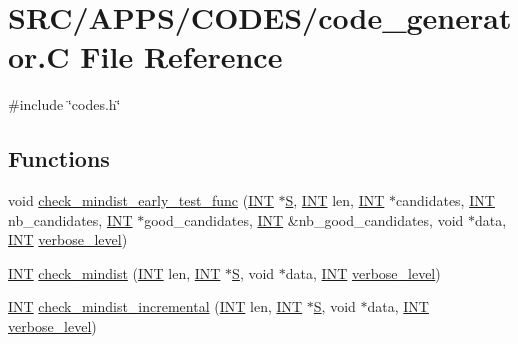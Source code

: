 \hypertarget{code__generator_8_c}{}\section{S\+R\+C/\+A\+P\+P\+S/\+C\+O\+D\+E\+S/code\+\_\+generator.C File Reference}
\label{code__generator_8_c}
{\ttfamily \#include \char`\"{}codes.\+h\char`\"{}}\newline
\subsection*{Functions}
\begin{DoxyCompactItemize}
\item 
void \mbox{\hyperlink{code__generator_8_c_a17bf777333c5e6dcb107d8de7ceffe5d}{check\+\_\+mindist\+\_\+early\+\_\+test\+\_\+func}} (\mbox{\hyperlink{galois_8h_a09fddde158a3a20bd2dcadb609de11dc}{I\+NT}} $\ast$\mbox{\hyperlink{simeon_8_c_adab47f8243f1b5a2c31df2535d6b37d0}{S}}, \mbox{\hyperlink{galois_8h_a09fddde158a3a20bd2dcadb609de11dc}{I\+NT}} len, \mbox{\hyperlink{galois_8h_a09fddde158a3a20bd2dcadb609de11dc}{I\+NT}} $\ast$candidates, \mbox{\hyperlink{galois_8h_a09fddde158a3a20bd2dcadb609de11dc}{I\+NT}} nb\+\_\+candidates, \mbox{\hyperlink{galois_8h_a09fddde158a3a20bd2dcadb609de11dc}{I\+NT}} $\ast$good\+\_\+candidates, \mbox{\hyperlink{galois_8h_a09fddde158a3a20bd2dcadb609de11dc}{I\+NT}} \&nb\+\_\+good\+\_\+candidates, void $\ast$data, \mbox{\hyperlink{galois_8h_a09fddde158a3a20bd2dcadb609de11dc}{I\+NT}} \mbox{\hyperlink{simeon_8_c_a818073fbcc2f439e7c56952f67386122}{verbose\+\_\+level}})
\item 
\mbox{\hyperlink{galois_8h_a09fddde158a3a20bd2dcadb609de11dc}{I\+NT}} \mbox{\hyperlink{code__generator_8_c_a4cbbea8903f9191af2e73db473ac1df0}{check\+\_\+mindist}} (\mbox{\hyperlink{galois_8h_a09fddde158a3a20bd2dcadb609de11dc}{I\+NT}} len, \mbox{\hyperlink{galois_8h_a09fddde158a3a20bd2dcadb609de11dc}{I\+NT}} $\ast$\mbox{\hyperlink{simeon_8_c_adab47f8243f1b5a2c31df2535d6b37d0}{S}}, void $\ast$data, \mbox{\hyperlink{galois_8h_a09fddde158a3a20bd2dcadb609de11dc}{I\+NT}} \mbox{\hyperlink{simeon_8_c_a818073fbcc2f439e7c56952f67386122}{verbose\+\_\+level}})
\item 
\mbox{\hyperlink{galois_8h_a09fddde158a3a20bd2dcadb609de11dc}{I\+NT}} \mbox{\hyperlink{code__generator_8_c_aecafcba0106d72bc644cf87a6ed937e5}{check\+\_\+mindist\+\_\+incremental}} (\mbox{\hyperlink{galois_8h_a09fddde158a3a20bd2dcadb609de11dc}{I\+NT}} len, \mbox{\hyperlink{galois_8h_a09fddde158a3a20bd2dcadb609de11dc}{I\+NT}} $\ast$\mbox{\hyperlink{simeon_8_c_adab47f8243f1b5a2c31df2535d6b37d0}{S}}, void $\ast$data, \mbox{\hyperlink{galois_8h_a09fddde158a3a20bd2dcadb609de11dc}{I\+NT}} \mbox{\hyperlink{simeon_8_c_a818073fbcc2f439e7c56952f67386122}{verbose\+\_\+level}})

\end{DoxyCompactItemize}
